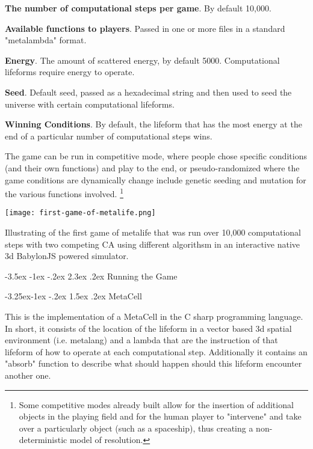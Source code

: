 \documentclass[11pt]{article}
\makeatletter
\renewcommand\section{\@startsection {section}{1}{\z@}%
                                       {-3.5ex \@plus -1ex \@minus -.2ex}%
                                       {2.3ex \@plus.2ex}%
                                       {\normalfont\fontfamily{phv}\fontsize{16}{19}\bfseries}}
\renewcommand\subsection{\@startsection{subsection}{2}{\z@}%
                                         {-3.25ex\@plus -1ex \@minus -.2ex}%
                                         {1.5ex \@plus .2ex}%
                                         {\normalfont\fontfamily{phv}\fontsize{14}{17}\bfseries}}
\makeatother
\begin{document}
\textbf{The number of computational steps per game}. By default 10,000.

\textbf{Available functions to players}. Passed in one or more files in a standard "metalambda" format.

\textbf{Energy}. The amount of scattered energy, by default 5000. Computational lifeforms require energy to operate. 

\textbf{Seed}. Default seed, passed as a hexadecimal string and then used to seed the universe with certain  computational lifeforms. 

\textbf{Winning Conditions}. By default, the lifeform that has the most energy at the end of a particular number of computational steps wins.   


The game can be run in competitive mode, where people chose specific conditions (and their own functions) and play to the end, or pseudo-randomized where the game conditions are dynamically change include genetic seeding and mutation for the various functions involved. \footnote{Some competitive modes already built allow for the insertion of additional objects in the playing field and for the human player to "intervene" and take over a particularly object (such as a spaceship), thus creating a non-deterministic model of resolution.} 

\texttt{[image: first-game-of-metalife.png]}

Illustrating of the first game of metalife that was run over 10,000 computational steps with two competing CA using different algorithsm in an interactive native 3d BabylonJS powered simulator. 



\section{Running the Game} \label{s:numerical}

\subsection{MetaCell} \label{s:numerical}

This is the implementation of a MetaCell in the C sharp programming language. In short, it consists of the location of the lifeform in a vector based 3d spatial environment (i.e. metalang) and a lambda that are the instruction of that lifeform of how to operate at each computational step. Additionally it contains an "absorb" function to describe what should happen should this lifeform encounter another one. 
\end{document}
